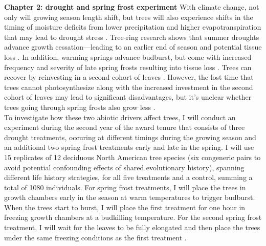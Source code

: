 \documentclass[12pt]{article}
\begin{document}
\textbf{Chapter 2: drought and spring frost experiment}
With climate change, not only will growing season length shift, but trees will also experience shifts in the timing of moisture deficits from lower precipitation and higher evapotranspiration that may lead to drought stress \citep{dox_wood_2022}. Tree-ring research shows that summer droughts advance growth cessation---leading to an earlier end of season\citep{kang_earlier_2023} and potential tissue loss \citep{kramer_why_2012}. In addition, warming springs advance budburst, but come with increased frequency and severity of late spring frosts resulting into tissue loss \citep{baumgarten_no_2023,kramer_why_2012}. Trees can recover by reinvesting in a second cohort of leaves \citep{baumgarten_no_2023,dandrea_winters_2019}. However, the lost time that trees cannot photosynthesize along with the increased investment in the second cohort of leaves may lead to significant disadvantages, but it's unclear whether trees going through spring frosts also grow less \citep{baumgarten_no_2023}. \\
To investigate how these two abiotic drivers affect trees, I will conduct an experiment during the second year of the award tenure that consists of three drought treatments, occuring at different timings during the growing season and an additional two spring frost treatments early and late in the spring. I will use 15 replicates of 12 deciduous North American tree species (six congeneric pairs to avoid potential confounding effects of shared evolutionary history), spanning different life history strategies, for all five treatments and a control, summing a total of 1080 individuals. For spring frost treatments, I will place the trees in growth chambers early in the season at warm temperatures to trigger budburst. When the trees start to burst, I will place the first treatment for one hour in freezing growth chambers at a budkilling temperature. For the second spring frost treatment, I will wait for the leaves to be fully elongated and then place the trees under the same freezing conditions as the first treatment \citep{zohner_increased_2018}.\\
\end{document}
